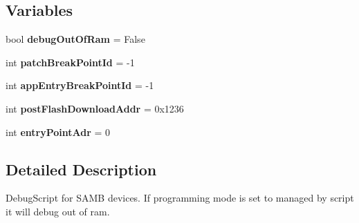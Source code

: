 \subsection*{Variables}
\begin{DoxyCompactItemize}
\item 
\mbox{\label{namespacedebughooks_a4453080c049b935096a9399726aaff65}} 
bool {\bfseries debug\+Out\+Of\+Ram} = False
\item 
\mbox{\label{namespacedebughooks_ace200a02851163ba9904ccdde2991a30}} 
int {\bfseries patch\+Break\+Point\+Id} = -\/1
\item 
\mbox{\label{namespacedebughooks_af0787e398633654faa72900223e5dd40}} 
int {\bfseries app\+Entry\+Break\+Point\+Id} = -\/1
\item 
\mbox{\label{namespacedebughooks_a7085fd6725027f087010919eb35a91a9}} 
int {\bfseries post\+Flash\+Download\+Addr} = 0x1236
\item 
\mbox{\label{namespacedebughooks_a10baaf1b59cde3b326d8dcc5ed34bfbf}} 
int {\bfseries entry\+Point\+Adr} = 0
\end{DoxyCompactItemize}


\subsection{Detailed Description}
\begin{DoxyVerb}DebugScript for SAMB devices.
If programming mode is set to managed by script it will debug out of ram.
\end{DoxyVerb}
 